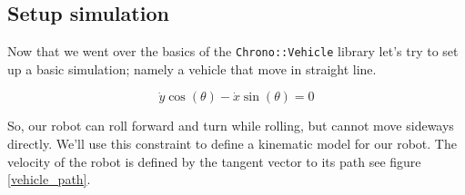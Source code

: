 \subsection{Setup simulation}
Now that we went over the basics of the \lstinline{Chrono::Vehicle} library let's try to set up a basic simulation; namely a vehicle that move in straight line.

\begin{equation}
\dot{y}\cos(\theta) - \dot{x}\sin(\theta) = 0
\end{equation} 


So, our robot can roll forward and turn while rolling, but cannot move sideways directly. We'll use this constraint to define a kinematic model for our robot. The velocity of the robot is defined by the tangent vector to its path see figure \ref{vehicle_path}. 













